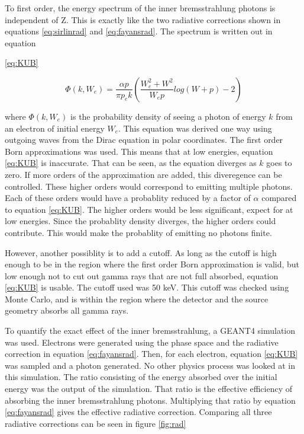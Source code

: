 To first order, the energy spectrum of the inner bremsstrahlung photons is independent of Z.
This is exactly like the two radiative corrections shown in equations \ref{eq:sirlinrad} and \ref{eq:fayansrad}. 
The spectrum is written out in equation{\ref{eq:KUB} \cite{Kni36}

\begin{equation}
	\Phi(k,W_{e}) = \frac{ \alpha p}{ \pi p_{e} k} ( \frac{W_{e}^{2} + W^{2}}{W_{e}p}log(W + p) - 2 )
	\label{eq:KUB}
\end{equation}

where $\Phi(k,W_{e})$ is the probability density of seeing a photon of energy $k$ from an electron of initial energy $W_{e}$.
This equation was derived one way using outgoing waves from the Dirac equation in polar coordinates.
The first order Born approximations was used.
This means that at low energies, equation \ref{eq:KUB} is inaccurate. 
That can be seen, as the equation diverges as $k$ goes to zero.
If more orders of the approximation are added, this diveregence can be controlled.
These higher orders would correspond to emitting multiple photons.
Each of these orders would have a probablity reduced by a factor of $\alpha$ compared to equation \ref{eq:KUB}.
The higher orders would be less significant, expect for at low energies. 
Since the probablity density diverges, the higher orders could contribute.
This would make the probablity of emitting no photons finite.	 		

However, another possiblity is to add a cutoff. 
As long as the cutoff is high enough to be in the region where the first order Born approximation is valid, but low enough not to cut out gamma rays that are not full absorbed, equation \ref{eq:KUB} is usable.
The cutoff used was 50 keV.
This cutoff was checked using Monte Carlo, and is within the region where the detector and the source geometry absorbs all gamma rays.

To quantify the exact effect of the inner bremsstrahlung, a GEANT4 simulation was used.
Electrons were generated using the phase space and the radiative correction in equation \ref{eq:fayansrad}.
Then, for each electron, equation \ref{eq:KUB} was sampled and a photon generated.
No other physics process was looked at in this simulation.
The ratio consisting of the energy absorbed over the initial energy was the output of the simulation.
That ratio is the effective efficiency of absorbing the inner bremsstrahlung photons.
Multiplying that ratio by equation \ref{eq:fayansrad} gives the effective radiative correction.
Comparing all three radiative corrections can be seen in figure \ref{fig:rad}

}
